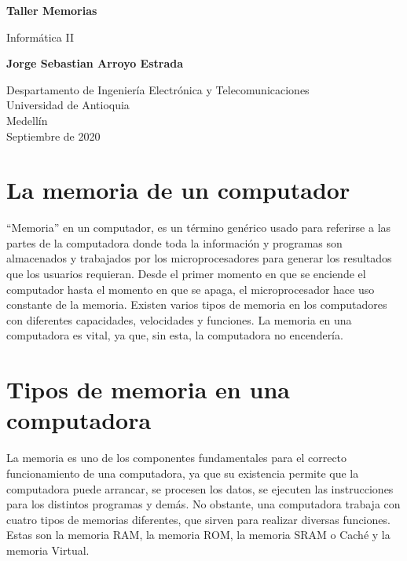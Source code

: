 \documentclass{article}
\begin{document}
\begin{titlepage}
    \begin{center}
        \vspace*{1cm}
            
        \huge
        \textbf{Taller Memorias}
            
        \vspace{1.5cm}
        \LARGE
        Informática II
            
        \vspace{1.5cm}
            
        \textbf{Jorge Sebastian Arroyo Estrada}
            
        \vfill
            
        \vspace{0.8cm}
            
        \Large
        Despartamento de Ingeniería Electrónica y Telecomunicaciones\\
        Universidad de Antioquia\\
        Medellín\\
        Septiembre de 2020
            
    \end{center}
\end{titlepage}

\tableofcontents

\section{La memoria de un computador}
“Memoria” en un computador, es un término genérico usado para referirse a las partes de la computadora donde toda la información y programas son almacenados y trabajados por los microprocesadores para generar los resultados que los usuarios requieran.\newline
Desde el primer momento en que se enciende el computador hasta el momento en que se apaga, el microprocesador hace uso constante de la memoria. Existen varios tipos de memoria en los computadores con diferentes capacidades, velocidades y funciones. La memoria en una computadora es vital, ya que, sin esta, la computadora no encendería.\cite{ref}

\section{Tipos de memoria en una computadora}
La memoria es uno de los componentes fundamentales para el correcto funcionamiento de una computadora, ya que su existencia permite que la computadora puede arrancar, se procesen los datos, se ejecuten las instrucciones para los distintos programas y demás.\newline
No obstante, una computadora trabaja con cuatro tipos de memorias diferentes, que sirven para realizar diversas funciones. Estas son la memoria RAM, la memoria ROM, la memoria SRAM o Caché y la memoria Virtual.\newline
\end{document}
